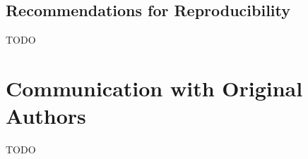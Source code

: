 \documentclass{article}
\begin{document}
\subsection{Recommendations for Reproducibility}
TODO

\section*{Communication with Original Authors}
TODO


\end{document}
